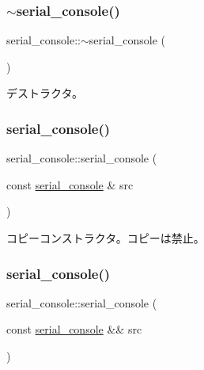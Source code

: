 \subsubsection{\texorpdfstring{$\sim$serial\+\_\+console()}{~serial\_console()}}
{\footnotesize\ttfamily serial\+\_\+console\+::$\sim$serial\+\_\+console (\begin{DoxyParamCaption}{ }\end{DoxyParamCaption})\hspace{0.3cm}{\ttfamily [virtual]}}

デストラクタ。 \hypertarget{classserial__console_ab4ff2b180736394d4f90b8165ce5277b}{}\label{classserial__console_ab4ff2b180736394d4f90b8165ce5277b} 
\subsubsection{\texorpdfstring{serial\+\_\+console()}{serial\_console()}\hspace{0.1cm}{\footnotesize\ttfamily [2/3]}}
{\footnotesize\ttfamily serial\+\_\+console\+::serial\+\_\+console (\begin{DoxyParamCaption}\item[{const \hyperlink{classserial__console}{serial\+\_\+console} \&}]{src }\end{DoxyParamCaption})\hspace{0.3cm}{\ttfamily [delete]}}

コピーコンストラクタ。コピーは禁止。 \hypertarget{classserial__console_a3882a2706380db177d22d44cef4db227}{}\label{classserial__console_a3882a2706380db177d22d44cef4db227} 
\subsubsection{\texorpdfstring{serial\+\_\+console()}{serial\_console()}\hspace{0.1cm}{\footnotesize\ttfamily [3/3]}}
{\footnotesize\ttfamily serial\+\_\+console\+::serial\+\_\+console (\begin{DoxyParamCaption}\item[{const \hyperlink{classserial__console}{serial\+\_\+console} \&\&}]{src }\end{DoxyParamCaption})\hspace{0.3cm}{\ttfamily [delete]}}

